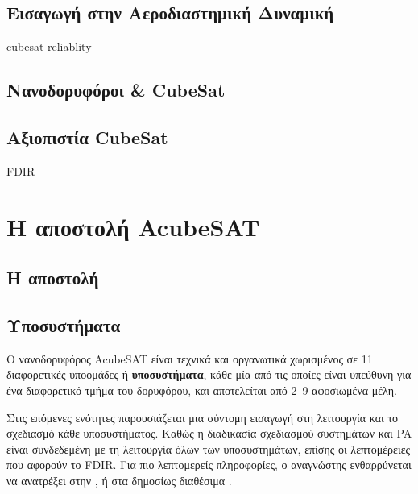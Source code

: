 \documentclass[a4paper,nobib]{tufte-book}
\begin{document}



\section{Εισαγωγή στην Αεροδιαστημική Δυναμική}
cubesat reliablity \autocite{durou_hierarchical_fault_2002}

\section{Νανοδορυφόροι \& CubeSat}

\section{Αξιοπιστία CubeSat}

\acf{FDIR}

\chapter{Η αποστολή AcubeSAT}

\section{Η αποστολή}

\section{Υποσυστήματα}

Ο νανοδορυφόρος AcubeSAT είναι τεχνικά και οργανωτικά χωρισμένος σε 11 διαφορετικές υποομάδες ή \textbf{υποσυστήματα}, κάθε μία από τις οποίες είναι υπεύθυνη για ένα διαφορετικό τμήμα του δορυφόρου, και αποτελείται από \SIrange{2}{9}{} αφοσιωμένα μέλη.

Στις επόμενες ενότητες παρουσιάζεται μια σύντομη εισαγωγή στη λειτουργία και το σχεδιασμό κάθε υποσυστήματος. Καθώς η διαδικασία σχεδιασμού συστημάτων και \acl{PA} είναι %
συνδεδεμένη με τη λειτουργία όλων των υποσυστημάτων,  επίσης οι λεπτομέρειες που αφορούν το \acs{FDIR}. Για πιο λεπτομερείς πληροφορίες, ο αναγνώστης ενθαρρύνεται να ανατρέξει στην , ή στα δημοσίως διαθέσιμα .
\end{document}
